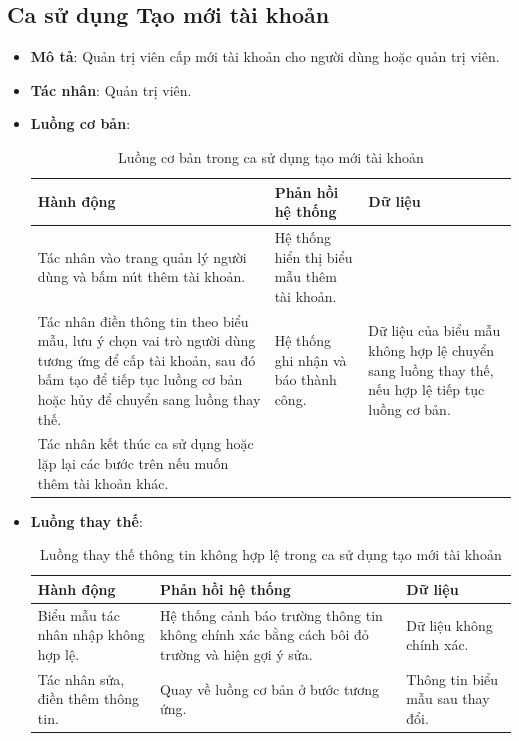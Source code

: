 \documentclass[./../main.tex]{subfiles}
\begin{document}
\subsection{Ca sử dụng Tạo mới tài khoản}
\begin{itemize}
    \item \textbf{Mô tả}: Quản trị viên cấp mới tài khoản cho người dùng hoặc quản trị viên.
    \item \textbf{Tác nhân}: Quản trị viên.
    \item \textbf{Luồng cơ bản}:
    \begin{table}[H]
    \caption{\label{uc-53}Luồng cơ bản trong ca sử dụng tạo mới tài khoản}
    \begin{tabularx}{\textwidth}{| X | X | X |}
        \hline
        \textbf{Hành động} & \textbf{Phản hồi hệ thống} & \textbf{Dữ liệu} 
        \\ \hline
         Tác nhân vào trang quản lý người dùng và bấm nút thêm tài khoản. & Hệ thống hiển thị biểu mẫu thêm tài khoản. & 
        \\ \hline
        Tác nhân điền thông tin theo biểu mẫu, lưu ý chọn vai trò người dùng tương ứng để cấp tài khoản, sau đó bấm tạo để tiếp tục luồng cơ bản hoặc hủy để chuyển sang luồng thay thế. & Hệ thống ghi nhận và báo thành công. & Dữ liệu của biểu mẫu không hợp lệ chuyển sang luồng thay thế, nếu hợp lệ tiếp tục luồng cơ bản.
        \\ \hline
        Tác nhân kết thúc ca sử dụng hoặc lặp lại các bước trên nếu muốn thêm tài khoản khác. & &
        \\ \hline
    \end{tabularx}
    \end{table}    
    \item \textbf{Luồng thay thế}: 
        \begin{table}[H]
        \caption{\label{uc-54}Luồng thay thế thông tin không hợp lệ trong ca sử dụng tạo mới tài khoản}
        \begin{tabularx}{\textwidth}{| X | X | X |}
            \hline
            \textbf{Hành động} & \textbf{Phản hồi hệ thống} & \textbf{Dữ liệu} \\ \hline
            Biểu mẫu tác nhân nhập không hợp lệ. & Hệ thống cảnh báo trường thông tin không chính xác bằng cách bôi đỏ trường và hiện gợi ý sửa. & Dữ liệu không chính xác.
            \\ \hline
            Tác nhân sửa, điền thêm thông tin. & Quay về luồng cơ bản ở bước tương ứng. & Thông tin biểu mẫu sau thay đổi.
            \\ \hline

\end{tabularx}
\end{table}
\end{itemize}
\end{document}
